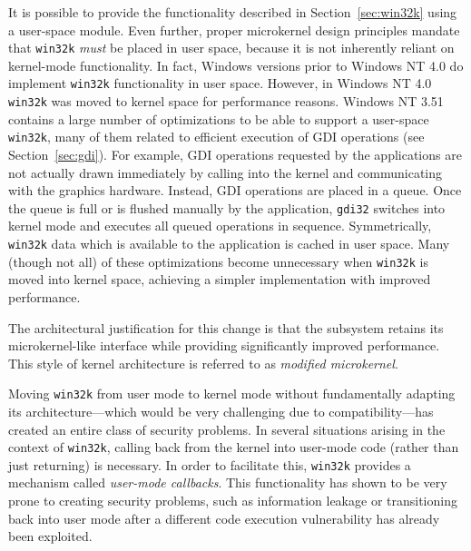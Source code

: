 			It is possible to provide the functionality described in Section~\ref{sec:win32k}
			using a user-space module. Even further, proper microkernel design principles
			mandate that \texttt{win32k} \emph{must} be placed in user space, because
			it is not inherently reliant on kernel-mode functionality.
			In fact, Windows versions prior to Windows NT 4.0
			do implement \texttt{win32k} functionality in user space. However,
			in Windows NT 4.0 \texttt{win32k} was moved to kernel space for
			performance reasons. Windows NT 3.51 contains a large number of optimizations
			to be able to support a user-space \texttt{win32k}, many of them related
			to efficient execution of GDI operations (see Section~\ref{sec:gdi}).
			For example, GDI operations requested by the applications are not
			actually drawn immediately by calling into the kernel and communicating
			with the graphics hardware. Instead, GDI operations are placed in a
			queue. Once the queue is full or is flushed manually by the application,
			\texttt{gdi32} switches
			into kernel mode and executes all queued operations
			in sequence. Symmetrically, \texttt{win32k} data which is available to the application
			is cached in user space.
			Many (though not all) of these optimizations become unnecessary when
			\texttt{win32k} is moved into kernel space, achieving a simpler implementation
			with improved performance.
			\cite{gdikernel} %

			The architectural justification for this change is that the subsystem
			retains its microkernel-like interface while providing significantly
			improved performance. This style of kernel architecture is referred
			to as \emph{modified microkernel}. \cite{gdikernel}

			Moving \texttt{win32k} from user mode to kernel mode without fundamentally
			adapting its architecture---which would be very challenging due to
			compatibility---has created an entire class of security problems.
			In several situations arising in the context of \texttt{win32k},
			calling back from the kernel into user-mode code (rather than just
			returning) is necessary. In order to facilitate this, \texttt{win32k}
			provides a mechanism called \textit{user-mode callbacks}. This
			functionality has shown to be very prone to creating security problems,
			such as information leakage or transitioning back into user mode after
			a different code execution vulnerability has already been exploited.
			\cite{mandy2011kernel}

